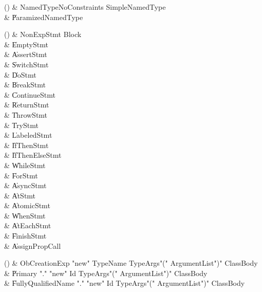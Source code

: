 \begin{bbgrammarappendix}{2.8in}

() & NamedTypeNoConstraints \label{prod:NamedTypeNoConstraints}  \: SimpleNamedType  \\

 &    \| ParamizedNamedType \\

\end{bbgrammarappendix}

\begin{bbgrammarappendix}{4.0in}

() & NonExpStmt \label{prod:NonExpStmt}  \: Block  \\

 &    \| EmptyStmt \\
 &    \| AssertStmt \\
 &    \| SwitchStmt \\
 &    \| DoStmt \\
 &    \| BreakStmt \\
 &    \| ContinueStmt \\
 &    \| ReturnStmt \\
 &    \| ThrowStmt \\
 &    \| TryStmt \\
 &    \| LabeledStmt \\
 &    \| IfThenStmt \\
 &    \| IfThenElseStmt \\
 &    \| WhileStmt \\
 &    \| ForStmt \\
 &    \| AsyncStmt \\
 &    \| AtStmt \\
 &    \| AtomicStmt \\
 &    \| WhenStmt \\
 &    \| AtEachStmt \\
 &    \| FinishStmt \\
 &    \| AssignPropCall \\

\end{bbgrammarappendix}

\begin{bbgrammarappendix}{3.7in}

() & ObCreationExp \label{prod:ObCreationExp}  \: \xcd"new" TypeName TypeArgs\opt \xcd"(" ArgumentList\opt \xcd")" ClassBody\opt  \\

 &    \| Primary \xcd"." \xcd"new" Id TypeArgs\opt \xcd"(" ArgumentList\opt \xcd")" ClassBody\opt \\
 &    \| FullyQualifiedName \xcd"." \xcd"new" Id TypeArgs\opt \xcd"(" ArgumentList\opt \xcd")" ClassBody\opt \\

\end{bbgrammarappendix}

